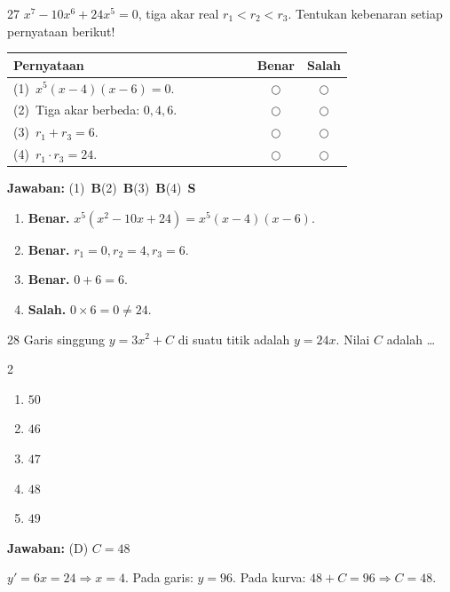 \documentclass[11pt]{article}
\newcommand{\jawaban}[1]{%
  \noindent\colorbox{gold!30}{\parbox{\dimexpr\linewidth-2\fboxsep\relax}{%
    \textbf{Jawaban:} #1}}\par\smallskip}
\newenvironment{pilB}{%
  \par\smallskip\begin{multicols}{2}
  \begin{enumerate}[label=(\Alph*),leftmargin=*,itemsep=1pt,topsep=3pt]}%
  {\end{enumerate}\end{multicols}}
\begin{document}
\begin{soal}{27}
$x^7-10x^6+24x^5=0$, tiga akar real $r_1<r_2<r_3$.
Tentukan kebenaran setiap pernyataan berikut!

\par\smallskip
{\renewcommand{\arraystretch}{1.4}%
\begin{tabular}{@{}p{0.76\linewidth}cc@{}}
\hline\textbf{Pernyataan}&\textbf{Benar}&\textbf{Salah}\\\hline
(1)~$x^5(x-4)(x-6)=0$.&$\bigcirc$&$\bigcirc$\\
(2)~Tiga akar berbeda: $0,4,6$.&$\bigcirc$&$\bigcirc$\\
(3)~$r_1+r_3=6$.&$\bigcirc$&$\bigcirc$\\
(4)~$r_1\cdot r_3=24$.&$\bigcirc$&$\bigcirc$\\\hline
\end{tabular}}
\end{soal}
\begin{pembox}
\jawaban{(1)~\textbf{B}\quad(2)~\textbf{B}\quad(3)~\textbf{B}\quad(4)~\textbf{S}}
\begin{enumerate}[leftmargin=*,topsep=2pt,itemsep=2pt]
\item \textbf{Benar.} $x^5(x^2-10x+24)=x^5(x-4)(x-6)$.
\item \textbf{Benar.} $r_1=0,r_2=4,r_3=6$.
\item \textbf{Benar.} $0+6=6$.
\item \textbf{Salah.} $0\times6=0\neq24$.
\end{enumerate}
\end{pembox}

\begin{soal}{28}
Garis singgung $y=3x^2+C$ di suatu titik adalah $y=24x$. Nilai $C$ adalah \ldots
\begin{pilB}\item $50$\item $46$\item $47$\item $48$\item $49$\end{pilB}
\end{soal}
\begin{pembox}
\jawaban{(D) $C=48$}
$y'=6x=24\Rightarrow x=4$. Pada garis: $y=96$. Pada kurva: $48+C=96\Rightarrow C=48$.
\end{pembox}
\end{document}
